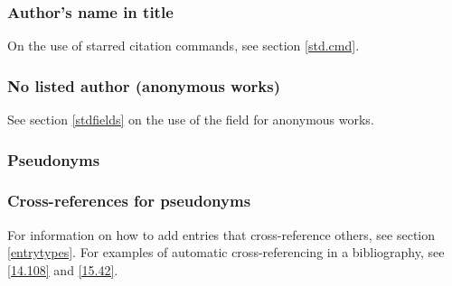\documentclass[11pt,letterpaper,oneside]{article}
\begin{document}
\subsubsection{Author's name in title}
\label{14.78}

On the use of starred citation commands, see section \ref{std.cmd}.

\begin{citebib}
\item \cite*[233]{franklin1868}
\item \cite*[234]{franklin1868}
\end{citebib}

\subsubsection{No listed author (anonymous works)}
\label{14.79}

See section \ref{stdfields} on the use of the 
field for anonymous works.

\begin{citebib}
\item \cite{anon1610}
\item \cite{anon1547}
\item \cite{horsley1796}
\item \cite{hawkes1834}
\end{citebib}

\subsubsection{Pseudonyms}

\begin{citebib}
\item \cite{akmuckraker2008}
\item \cite{carre1982}
\item \cite{stendhal1925}
\end{citebib}

\subsubsection{Cross-references for pseudonyms}
\label{14.81}

For information on how to add entries that cross-reference others, see
section \ref{entrytypes}. For examples of automatic cross-referencing
in a bibliography, see \ref{14.108} and \ref{15.42}.
\end{document}
